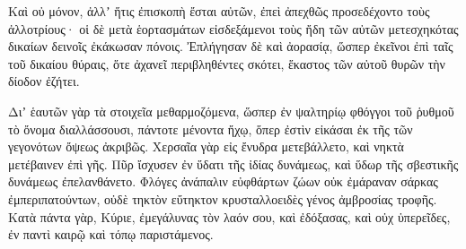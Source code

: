 {Καὶ οὐ μόνον, ἀλλʼ ἥτις ἐπισκοπὴ ἔσται αὐτῶν, ἐπεὶ ἀπεχθῶς προσεδέχοντο τοὺς ἀλλοτρίους·
οἱ δὲ μετὰ ἑορτασμάτων εἰσδεξάμενοι τοὺς ἤδη τῶν αὐτῶν μετεσχηκότας δικαίων δεινοῖς ἐκάκωσαν πόνοις.
Ἐπλήγησαν δὲ καὶ ἀορασίᾳ, ὥσπερ ἐκεῖνοι ἐπὶ ταῖς τοῦ δικαίου θύραις, ὅτε ἀχανεῖ περιβληθέντες σκότει, ἕκαστος τῶν αὐτοῦ θυρῶν τὴν δίοδον ἐζήτει.
\par }{\PP {}Διʼ ἑαυτῶν γὰρ τὰ στοιχεῖα μεθαρμοζόμενα, ὥσπερ ἐν ψαλτηρίῳ φθόγγοι τοῦ ῥυθμοῦ τὸ ὄνομα διαλλάσσουσι, πάντοτε μένοντα ἤχῳ, ὅπερ ἐστὶν εἰκάσαι ἐκ τῆς τῶν γεγονότων ὄψεως ἀκριβῶς.
Χερσαῖα γὰρ εἰς ἔνυδρα μετεβάλλετο, καὶ νηκτὰ μετέβαινεν ἐπὶ γῆς.
Πῦρ ἴσχυσεν ἐν ὕδατι τῆς ἰδίας δυνάμεως, καὶ ὕδωρ τῆς σβεστικῆς δυνάμεως ἐπελανθάνετο.
Φλόγες ἀνάπαλιν εὐφθάρτων ζώων οὐκ ἐμάραναν σάρκας ἐμπεριπατούντων, οὐδὲ τηκτὸν εὔτηκτον κρυσταλλοειδὲς γένος ἀμβροσίας τροφῆς.
Κατὰ πάντα γὰρ, Κύριε, ἐμεγάλυνας τὸν λαόν σου, καὶ ἐδόξασας, καὶ οὐχ ὑπερεῖδες, ἐν παντὶ καιρῷ καὶ τόπῳ παριστάμενος.
\par }